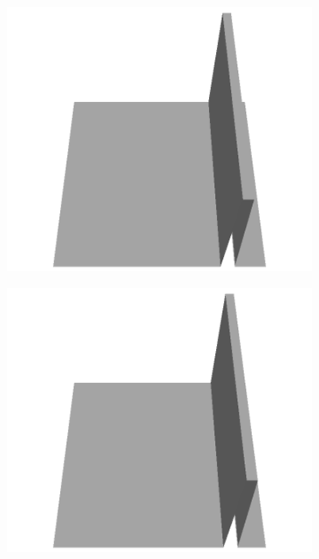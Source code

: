 \documentclass[../document.tex]{subfiles}
\begin{document}
\begin{figure}[H]
\begin{subfigure}[b]{0.065\textwidth}
    \includegraphics[width=\linewidth]{../img/5/custom_patches/walls_front/all/23-3d.png}
    \end{subfigure}
    \begin{subfigure}[b]{0.065\textwidth}
    \includegraphics[width=\linewidth]{../img/5/custom_patches/walls_front/all/22-3d.png}
    \end{subfigure}
    \begin{subfigure}[b]{0.065\textwidth}

\end{subfigure}
\end{figure}
\end{document}
